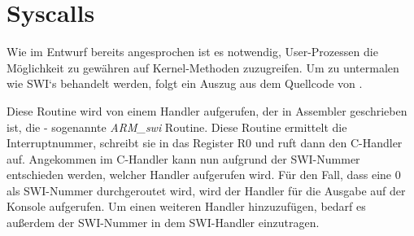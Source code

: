 \section{Syscalls}
Wie im Entwurf bereits angesprochen ist es notwendig, User-Prozessen die M\"oglichkeit zu gew\"ahren auf Kernel-Methoden zuzugreifen. Um zu untermalen wie SWI`s behandelt werden, folgt ein Auszug aus dem Quellcode von \mops.

Diese Routine wird von einem Handler aufgerufen, der in Assembler geschrieben ist, die - sogenannte \textit{ARM\_swi} Routine. Diese Routine ermittelt die Interruptnummer, schreibt sie in das Register R0 und ruft dann den C-Handler auf. Angekommen im C-Handler kann nun aufgrund der SWI-Nummer entschieden werden, welcher Handler aufgerufen wird. F\"ur den Fall, dass eine 0 als SWI-Nummer durchgeroutet wird, wird der Handler f\"ur die Ausgabe auf der Konsole aufgerufen. Um einen weiteren Handler hinzuzuf\"ugen, bedarf es au\ss erdem der SWI-Nummer in dem SWI-Handler einzutragen.

